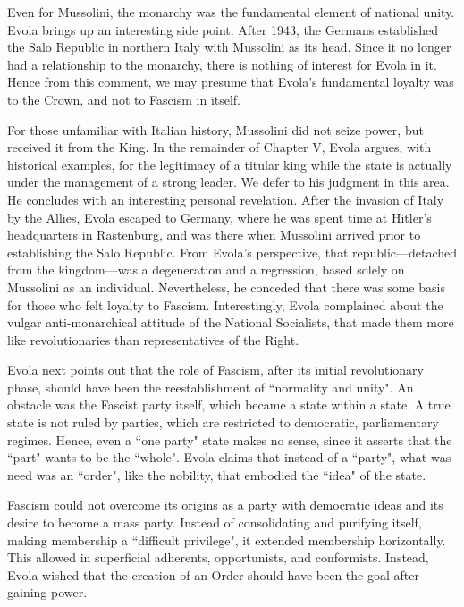 Even for Mussolini, the monarchy was the fundamental element of national unity. Evola brings up an interesting side point. After 1943, the Germans established the Salo Republic in northern Italy with Mussolini as its head. Since it no longer had a relationship to the monarchy, there is nothing of interest for Evola in it. Hence from this comment, we may presume that Evola's fundamental loyalty was to the Crown, and not to Fascism in itself.

For those unfamiliar with Italian history, Mussolini did not seize power, but received it from the King. In the remainder of Chapter V, Evola argues, with historical examples, for the legitimacy of a titular king while the state is actually under the management of a strong leader. We defer to his judgment in this area. He concludes with an interesting personal revelation. After the invasion of Italy by the Allies, Evola escaped to Germany, where he was spent time at Hitler's headquarters in Rastenburg, and was there when Mussolini arrived prior to establishing the Salo Republic. From Evola's perspective, that republic—detached from the kingdom—was a degeneration and a regression, based solely on Mussolini as an individual. Nevertheless, he conceded that there was some basis for those who felt loyalty to Fascism. Interestingly, Evola complained about the vulgar anti-monarchical attitude of the National Socialists, that made them more like revolutionaries than representatives of the Right.

Evola next points out that the role of Fascism, after its initial revolutionary phase, should have been the reestablishment of ``normality and unity". An obstacle was the Fascist party itself, which became a state within a state. A true state is not ruled by parties, which are restricted to democratic, parliamentary regimes. Hence, even a ``one party" state makes no sense, since it asserts that the ``part" wants to be the ``whole". Evola claims that instead of a ``party", what was need was an ``order", like the nobility, that embodied the ``idea" of the state.

Fascism could not overcome its origins as a party with democratic ideas and its desire to become a mass party. Instead of consolidating and purifying itself, making membership a ``difficult privilege", it extended membership horizontally. This allowed in superficial adherents, opportunists, and conformists. Instead, Evola wished that the creation of an Order should have been the goal after gaining power.

